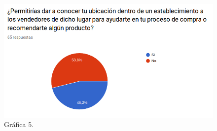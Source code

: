 \FloatBarrier
\begin{figure}[htbp!]
		\centering
			\includegraphics[width=.7 \textwidth]{imagenes/graficas/grafico5}
		\caption{Gráfica 5. }\end{figure}
\FloatBarrier